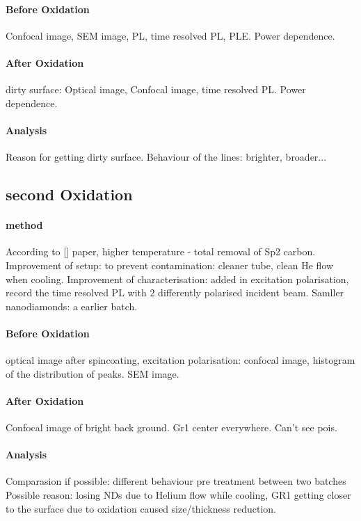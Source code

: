 \paragraph{Before Oxidation} Confocal image, SEM image, PL, time resolved PL, PLE. Power dependence.

\paragraph{After Oxidation}dirty surface: Optical image, Confocal image, time resolved PL. Power dependence.

\paragraph{Analysis} Reason for getting dirty surface. Behaviour of the lines: brighter, broader...

\subsection[Second Oxidation]{second Oxidation}

\paragraph{method} According to [] paper, higher temperature - total removal of Sp2 carbon. Improvement of setup: to prevent contamination: cleaner tube, clean He flow when cooling. Improvement of characterisation: added in excitation polarisation, record the time resolved PL with 2 differently polarised incident beam. Samller nanodiamonds: a earlier batch.

\paragraph{Before Oxidation} optical image after spincoating, excitation polarisation: confocal image, histogram of the distribution of peaks. SEM image.
\paragraph{After Oxidation} Confocal image of bright back ground. Gr1 center everywhere. Can't see pois.
\paragraph{Analysis} 
Comparasion if possible: different behaviour pre treatment between two batches
Possible reason: losing NDs due to Helium flow while cooling, GR1 getting closer to the surface due to oxidation caused size/thickness reduction.

